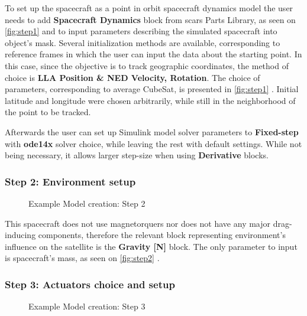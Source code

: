             To set up the spacecraft as a point in orbit spacecraft dynamics model the user needs to add \textbf{Spacecraft Dynamics} block from \ac{scars} Parts Library, as seen on \autoref{fig:step1}  and to input parameters describing the simulated spacecraft into object's mask. Several initialization methods are available, corresponding to reference frames in which the user can input the data about the starting point. In this case, since the objective is to track geographic coordinates, the method of choice is \textbf{LLA Position \& NED Velocity, Rotation}. The choice of parameters, corresponding to average CubeSat, is presented in \autoref{fig:step1} . Initial latitude and longitude were chosen arbitrarily, while still in the neighborhood of the point to be tracked.
            
            Afterwards the user can set up Simulink model solver parameters to \textbf{Fixed-step} with \textbf{ode14x} solver choice, while leaving the rest with default settings. While not being necessary, it allows larger step-size when using \textbf{Derivative} blocks.

        \subsubsection*{Step 2: Environment setup}
            \begin{figure}[H]
                \centering
                \qquad
                \caption{Example Model creation: Step 2}%
                \label{fig:step2}%
            \end{figure}

            This spacecraft does not use magnetorquers nor does not have any major drag-inducing components, therefore the relevant block representing environment's influence on the satellite is the \textbf{Gravity [N]} block. The only parameter to input is spacecraft's mass, as seen on \autoref{fig:step2} .

        \subsubsection*{Step 3: Actuators choice and setup}
            \begin{figure}[H]
                \centering
                \qquad
                \caption{Example Model creation: Step 3}%
                \label{fig:step3}%
            \end{figure}

